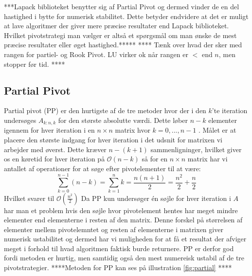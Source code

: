 \documentclass{article}
\begin{document}
\newline\newline
***Lapack biblioteket benytter sig af Partial Pivot og dermed vinder de en del hastighed i bytte for numerisk stabilitet. Dette betyder endvidere at det er muligt at lave algoritmer der giver mere præcise resultater end Lapack biblioteket. Hvilket pivotstrategi man vælger er altså et spørgsmål om man ønske de mest præcise resultater eller øget hastighed.*****
\newline\newline
****
Tænk over hvad der sker med rangen for partiel- og Rook Pivot. LU virker ok når rangen er $<$ end $n$, men stopper før tid.
****
\newline

\subsection{Partial Pivot}
Partial pivot (PP) er den hurtigste af de tre metoder hvor der i den $k$'te iteration undersøges $A_{k:n, k}$ for den største absolutte værdi. Dette løber $n - k$ elementer igennem for hver iteration i en $n \times n$ matrix hvor $k = 0, ..., n-1$ . Målet er at placere den største indgang for hver iteration i det udsnit for matrixen vi arbejder med øverst. Dette kræver $n-(k+1)$ sammenligninger, hvilket giver os en køretid for hver iteration på $\mathcal{O}(n-k)$ så for en $n \times n$ matrix har vi antallet af operationer for at søge efter pivotelementer til at være:
$$
\sum\limits_{k=0}^{n-1} \left(n-k\right) = \sum\limits_{k=1}^{n} k = \frac{n(n+1)}{2} = \frac{n^2}{2} + \frac{n}{2}
$$
Hvilket svarer til $\mathcal{O}(\frac{n^2}{2})$ \newline\newline
Da PP kun undersøger én søjle for hver iteration i $A$ har man et problem hvis den søjle hvor pivotelement hentes har meget mindre elementer end elementerne i resten af den matrix. Denne forskel på størrelsen af elementer mellem pivotelemntet og resten af elementerne i matrixen giver numerisk ustabilitet og dermed har vi muligheden for at få et resultat der afviger meget i forhold til hvad algoritmen faktisk burde returnere. PP er derfor god fordi metoden er hurtig, men samtidig også den mest numereisk ustabil af de tre pivotstrategier.
\newline\newline
****Metoden for PP kan ses på illustration \ref{fig:partial} ****
\newline\newline
\end{document}
